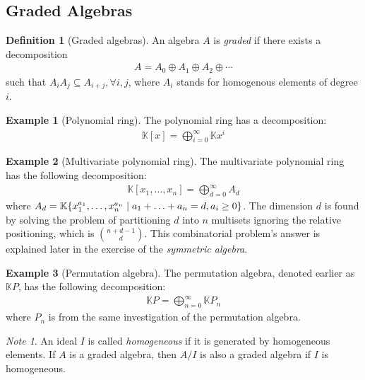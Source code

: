 \documentclass[svgnames]{article}
\theoremstyle{definition}
\newtheorem{Definition}{Definition}
\newtheorem*{Example*}{Example}
\theoremstyle{remark}
\newtheorem*{Note*}{Note}
\theoremstyle{underline}
\theoremstyle{underline}
\begin{document}
	\subsection{Graded Algebras}

	\begin{Definition}[Graded algebras]
		An algebra $A$ is \emph{graded} if there exists a decomposition
		\begin{gather*}
			A = A_0 \oplus A_1 \oplus A_2 \oplus \cdots
		\end{gather*}
		such that $A_i A_j \subseteq A_{i+j}, \forall i,j$, where $A_i$ stands for homogenous elements of degree $i$.
	\end{Definition}

	\begin{Example*}[Polynomial ring]
		The polynomial ring has a decomposition:
		\begin{gather*}
			\mathbb K[x] = \bigoplus_{i=0}^{\infty} \mathbb K x^i
		\end{gather*}
	\end{Example*}

	\begin{Example*}[Multivariate polynomial ring]
		The multivariate polynomial ring has the following decomposition:
		\begin{gather*}
			\mathbb K[x_1,\ldots,x_n] = \bigoplus_{d=0}^{\infty} A_d
		\end{gather*}
		where $A_d = \mathbb K\qty{x_1^{a_1},\ldots, x_n^{a_n}\mid a_1 + \ldots + a_n = d, a_i \geq 0}$. The dimension $d$ is found by solving the problem of partitioning $d$ into $n$ multisets ignoring the relative positioning, which is $\binom{n+d-1}{d}$. This combinatorial problem's answer is explained later in the exercise of the \emph{symmetric algebra}.
	\end{Example*}

	\begin{Example*}[Permutation algebra]
		The permutation algebra, denoted earlier as $\mathbb KP$, has the following decomposition:
		\begin{gather*}
			\mathbb KP = \bigoplus_{n=0}^{\infty} \mathbb KP_n
		\end{gather*}
		where $P_n$ is from the same investigation of the permutation algebra.
	\end{Example*}

	\begin{Note*}
		An ideal $I$ is called \emph{homogeneous} if it is generated by homogeneous elements. If $A$ is a graded algebra, then $A/I$ is also a graded algebra if $I$ is homogeneous.
	\end{Note*}
\end{document}
